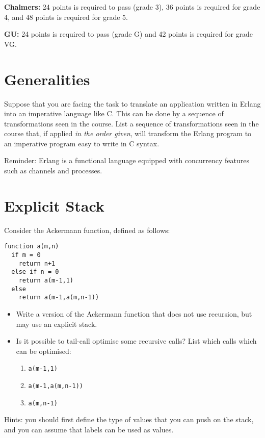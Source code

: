 \documentclass{article}
\begin{document}
  
\textbf{Chalmers:}
24 points is required to pass (grade 3), 36 points is required for
grade 4, and 48 points is required for grade 5. 

\textbf{GU:} 
24 points is required to pass (grade G) and 42 points is
required for grade VG.

\section{Generalities}

Suppose that you are facing the task to translate an application
written in Erlang into an imperative language like C. This can be done
by a sequence of transformations seen in the course.  List a sequence
of transformations seen in the course that, if applied \emph{in the
  order given}, will transform the Erlang program to an imperative
program easy to write in C syntax.

Reminder: Erlang is a functional language equipped with concurrency
features such as channels and processes.

\section{Explicit Stack}

Consider the Ackermann function, defined as follows:

\begin{verbatim}
function a(m,n) 
  if m = 0 
    return n+1
  else if n = 0
    return a(m-1,1)
  else
    return a(m-1,a(m,n-1))
\end{verbatim}

\begin{itemize}
\item Write a version of the Ackermann function that does not use
  recursion, but may use an explicit stack.
\item Is it possible to tail-call optimise some recursive
  calls? List which calls which can be optimised:
  \begin{enumerate}
  \item \texttt{a(m-1,1)}
  \item \texttt{a(m-1,a(m,n-1))}
  \item \texttt{a(m,n-1)}
  \end{enumerate}
\end{itemize}

Hints: you should first define the type of values that you can push on
the stack, and you can assume that labels can be used as values.
\end{document}
